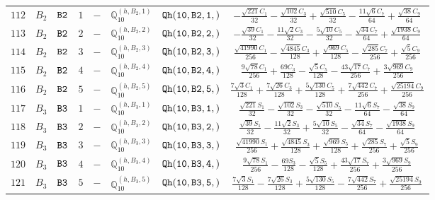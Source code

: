 \documentclass[fleqn,8pt]{jsarticle}
\begin{document}
\begin{table}[ht!]
\begin{center}
\begin{tabular}{cccccccc}
$ 112 $ & $ B_{2} $ & $ {\tt B2} $ & $ 1 $ & $ - $ & $ \mathbb{Q}_{10}^{(h,B_{2},1)} $ & $ {\tt Qh(10,B2,1,)} $ & $ - \frac{\sqrt{221} C_{1}}{32} - \frac{\sqrt{102} C_{3}}{32} + \frac{\sqrt{510} C_{5}}{32} - \frac{11 \sqrt{6} C_{7}}{64} + \frac{\sqrt{38} C_{9}}{64} $ \\
$ 113 $ & $ B_{2} $ & $ {\tt B2} $ & $ 2 $ & $ - $ & $ \mathbb{Q}_{10}^{(h,B_{2},2)} $ & $ {\tt Qh(10,B2,2,)} $ & $ - \frac{\sqrt{39} C_{1}}{32} - \frac{11 \sqrt{2} C_{3}}{32} - \frac{5 \sqrt{10} C_{5}}{32} - \frac{\sqrt{34} C_{7}}{64} + \frac{\sqrt{1938} C_{9}}{64} $ \\
$ 114 $ & $ B_{2} $ & $ {\tt B2} $ & $ 3 $ & $ - $ & $ \mathbb{Q}_{10}^{(h,B_{2},3)} $ & $ {\tt Qh(10,B2,3,)} $ & $ \frac{\sqrt{41990} C_{1}}{256} - \frac{\sqrt{4845} C_{3}}{128} + \frac{\sqrt{969} C_{5}}{128} - \frac{\sqrt{285} C_{7}}{256} + \frac{\sqrt{5} C_{9}}{256} $ \\
$ 115 $ & $ B_{2} $ & $ {\tt B2} $ & $ 4 $ & $ - $ & $ \mathbb{Q}_{10}^{(h,B_{2},4)} $ & $ {\tt Qh(10,B2,4,)} $ & $ \frac{9 \sqrt{78} C_{1}}{256} + \frac{69 C_{3}}{128} - \frac{\sqrt{5} C_{5}}{128} - \frac{43 \sqrt{17} C_{7}}{256} + \frac{3 \sqrt{969} C_{9}}{256} $ \\
$ 116 $ & $ B_{2} $ & $ {\tt B2} $ & $ 5 $ & $ - $ & $ \mathbb{Q}_{10}^{(h,B_{2},5)} $ & $ {\tt Qh(10,B2,5,)} $ & $ \frac{7 \sqrt{3} C_{1}}{128} + \frac{7 \sqrt{26} C_{3}}{128} + \frac{5 \sqrt{130} C_{5}}{128} + \frac{7 \sqrt{442} C_{7}}{256} + \frac{\sqrt{25194} C_{9}}{256} $ \\
$ 117 $ & $ B_{3} $ & $ {\tt B3} $ & $ 1 $ & $ - $ & $ \mathbb{Q}_{10}^{(h,B_{3},1)} $ & $ {\tt Qh(10,B3,1,)} $ & $ \frac{\sqrt{221} S_{1}}{32} - \frac{\sqrt{102} S_{3}}{32} - \frac{\sqrt{510} S_{5}}{32} - \frac{11 \sqrt{6} S_{7}}{64} - \frac{\sqrt{38} S_{9}}{64} $ \\
$ 118 $ & $ B_{3} $ & $ {\tt B3} $ & $ 2 $ & $ - $ & $ \mathbb{Q}_{10}^{(h,B_{3},2)} $ & $ {\tt Qh(10,B3,2,)} $ & $ \frac{\sqrt{39} S_{1}}{32} - \frac{11 \sqrt{2} S_{3}}{32} + \frac{5 \sqrt{10} S_{5}}{32} - \frac{\sqrt{34} S_{7}}{64} - \frac{\sqrt{1938} S_{9}}{64} $ \\
$ 119 $ & $ B_{3} $ & $ {\tt B3} $ & $ 3 $ & $ - $ & $ \mathbb{Q}_{10}^{(h,B_{3},3)} $ & $ {\tt Qh(10,B3,3,)} $ & $ \frac{\sqrt{41990} S_{1}}{256} + \frac{\sqrt{4845} S_{3}}{128} + \frac{\sqrt{969} S_{5}}{128} + \frac{\sqrt{285} S_{7}}{256} + \frac{\sqrt{5} S_{9}}{256} $ \\
$ 120 $ & $ B_{3} $ & $ {\tt B3} $ & $ 4 $ & $ - $ & $ \mathbb{Q}_{10}^{(h,B_{3},4)} $ & $ {\tt Qh(10,B3,4,)} $ & $ \frac{9 \sqrt{78} S_{1}}{256} - \frac{69 S_{3}}{128} - \frac{\sqrt{5} S_{5}}{128} + \frac{43 \sqrt{17} S_{7}}{256} + \frac{3 \sqrt{969} S_{9}}{256} $ \\
$ 121 $ & $ B_{3} $ & $ {\tt B3} $ & $ 5 $ & $ - $ & $ \mathbb{Q}_{10}^{(h,B_{3},5)} $ & $ {\tt Qh(10,B3,5,)} $ & $ \frac{7 \sqrt{3} S_{1}}{128} - \frac{7 \sqrt{26} S_{3}}{128} + \frac{5 \sqrt{130} S_{5}}{128} - \frac{7 \sqrt{442} S_{7}}{256} + \frac{\sqrt{25194} S_{9}}{256} $ \\
 \hline \hline
\end{tabular}
\end{center}
\end{table}
\end{document}
